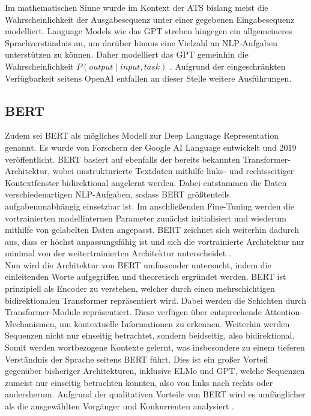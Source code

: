 \noindent
Im mathematischen Sinne wurde im Kontext der \ac{ATS} bislang meist die Wahrscheinlichkeit der Ausgabesequenz unter einer gegebenen Eingabesequenz modelliert. Language Models wie das \ac{GPT} streben hingegen ein allgemeineres Sprachverständnis an, um darüber hinaus eine Vielzahl an \ac{NLP}-Aufgaben unterstützen zu können. Daher modelliert das \ac{GPT} gemeinhin die Wahrscheinlichkeit $P(output \mid input, task)$ \cite[S.~2]{RAD19}. Aufgrund der eingeschränkten Verfügbarkeit seitens OpenAI entfallen an dieser Stelle weitere Ausführungen.


\subsection{BERT}
\noindent
Zudem sei \ac{BERT} als mögliches Modell zur Deep Language Representation genannt. Es wurde von Forschern der Google AI Language entwickelt und 2019 veröffentlicht. \ac{BERT} basiert auf ebenfalls der bereits bekannten Transformer-Architektur, wobei unstrukturierte Textdaten mithilfe links- und rechtsseitiger Kontextfenster bidirektional angelernt werden. Dabei entstammen die Daten verschiedenartigen \ac{NLP}-Aufgaben, sodass \ac{BERT} größtenteils aufgabenunabhängig einsetzbar ist. Im anschließenden Fine-Tuning werden die vortrainierten modellinternen Parameter zunächst initialisiert und wiederum mithilfe von gelabelten Daten angepasst. \ac{BERT} zeichnet sich weiterhin dadurch aus, dass er höchst anpassungsfähig ist und sich die vortrainierte Architektur nur minimal von der weitertrainierten Architektur unterscheidet \cite[S.~1-3]{DEV19}.\\

\noindent
Nun wird die Architektur von \ac{BERT} umfassender untersucht, indem die einleitenden Worte aufgegriffen und theoretisch ergründet werden. \ac{BERT} ist prinzipiell als Encoder zu verstehen, welcher durch einen mehrschichtigen bidirektionalen Transformer repräsentiert wird. Dabei werden die Schichten durch Transformer-Module repräsentiert. Diese verfügen über entsprechende Attention-Mechanismen, um kontextuelle Informationen zu erkennen. Weiterhin werden Sequenzen nicht nur einseitig betrachtet, sondern beidseitig, also bidirektional. Somit werden wortbezogene Kontexte gelernt, was insbesondere zu einem tieferen Verständnis der Sprache seitens \ac{BERT} führt. Dies ist ein großer Vorteil gegenüber bisheriger Architekturen, inklusive \ac{ELMo} und \ac{GPT}, welche Sequenzen zumeist nur einseitig betrachten konnten, also von links nach rechts oder andersherum. Aufgrund der qualitativen Vorteile von \ac{BERT} wird es umfänglicher als die ausgewählten Vorgänger und Konkurrenten analysiert \cite[S.~3]{DEV19}.
\newpage

